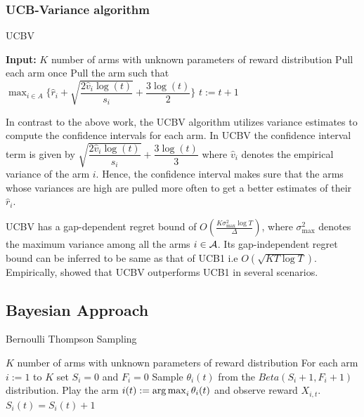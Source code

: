 \subsubsection{UCB-Variance algorithm}

\begin{algorithm}[!th]
\caption{UCBV}
\label{alg:ucbv}
\begin{algorithmic}[1]
\State \textbf{Input:} $K$ number of arms with unknown parameters of reward distribution
\State Pull each arm once
\State Pull the arm such that $\max_{i\in A}\bigg\lbrace\hat{r}_{i} + \sqrt{\dfrac{2\hat{v}_i\log (t)}{s_i}} + \dfrac{3\log (t)}{2}\bigg\rbrace$
\State $t:=t+1 $
 \EndFor
\end{algorithmic}
\end{algorithm}


    In contrast to the above work, the UCBV \citep{audibert2009exploration} algorithm utilizes variance estimates to compute the confidence intervals for each arm. In UCBV the confidence interval term is given by $\sqrt{\dfrac{2\hat{v}_i\log (t)}{s_i}} + \dfrac{3\log (t)}{3}$ where $\hat{v}_i$ denotes the empirical variance of the arm $i$. Hence, the confidence interval makes sure that the arms whose variances are high are pulled more often to get a better estimates of their $\hat{r}_i$.
    
    UCBV has a gap-dependent regret bound of $O\left(\frac{K\sigma_{\max}^{2}\log T}{\Delta}\right)$, where $\sigma_{\max}^{2}$ denotes the maximum variance among all the arms $i\in \mathcal{A}$. Its gap-independent regret bound can be inferred to be same as that of UCB1 i.e $O \left(\sqrt{KT\log T}\right)$. Empirically, \citet{audibert2009exploration} showed that UCBV outperforms UCB1 in several scenarios. 


\subsection{Bayesian Approach}

\begin{algorithm}[!th]
\caption{Bernoulli Thompson Sampling}
\label{alg:ts}
\begin{algorithmic}
 $K$ number of arms with unknown parameters of reward distribution
 For each arm $i:=1$ to $K$ set $S_i =0$ and $F_i =0$
\State {}
\State {}
\State Sample $\theta_{i}(t)$ from the $Beta(S_i+1,F_i+1)$ distribution.
\EndFor
\State Play the arm $i(t):=\operatorname*{arg\,max}_i\theta_i(t)$ and observe reward $X_{i,t}$.
$S_i (t) = S_i (t) + 1$
\EndIf
\EndFor
\end{algorithmic}
\end{algorithm}


